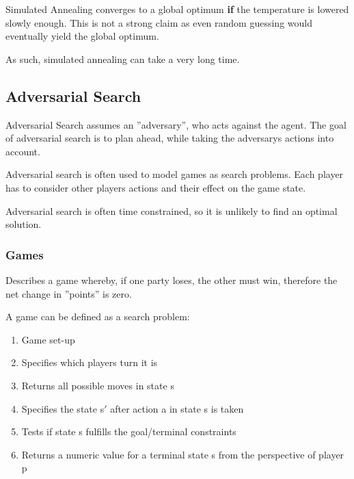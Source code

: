 \documentclass[
../../EiKI_Summary.tex,
]
{subfiles}
\begin{document}
Simulated Annealing converges to a global optimum \textbf{if} the temperature is lowered slowly enough. This is not a strong claim as even random guessing would eventually yield the global optimum. 

As such, simulated annealing can take a very long time.

\subsection{Adversarial Search}
\begin{defbox*}
    Adversarial Search assumes an ''adversary'', who acts against the agent. The goal of adversarial search is to plan ahead, while taking the adversarys actions into account.
\end{defbox*}

Adversarial search is often used to model games as search problems. Each player has to consider other players actions and their effect on the game state.

Adversarial search is often time constrained, so it is unlikely to find an optimal solution.

\subsubsection{Games}
\begin{defbox}
    Describes a game whereby, if one party loses, the other must win, therefore the net change in ''points'' is zero.
\end{defbox}

A game can be defined as a search problem:
\begin{enumerate}
    \item {} Game set-up
    \item {} Specifies which players turn it is
    \item {} Returns all possible moves in state s
    \item {} Specifies the state s$\prime$ after action a in state s is taken
    \item {} Tests if state s fulfills the goal/terminal constraints
    \item {} Returns a numeric value for a terminal state s from the perspective of player p
\end{enumerate}
\end{document}

